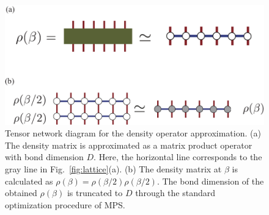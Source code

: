 \documentclass[reprint,amsmath,amssymb,aps,prx]{revtex4-2}
\begin{document}
\begin{figure}
  \begin{center}
    \includegraphics[width=\linewidth]{Figs/XTRG_MPO.pdf}
  \end{center}
  \caption{Tensor network diagram for the density operator approximation. (a) The density matrix is approximated as a matrix product operator with bond dimension $D$. Here, the horizontal line corresponds to the gray line in Fig.~\ref{fig:lattice}(a). (b) The density matrix at $\beta$ is calculated as $\rho(\beta)=\rho(\beta/2)\rho(\beta/2)$. The bond dimension of the obtained $\rho(\beta)$ is truncated to $D$ through the standard optimization procedure of MPS.}
  \label{fig:XTRG}
\end{figure}
\end{document}
